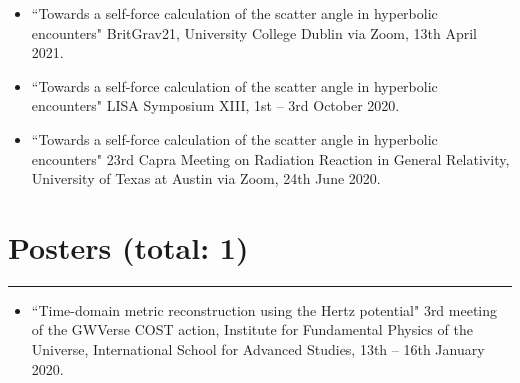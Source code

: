 \documentclass[10.5pt, oneside]{article}   	%
\begin{document}
\begin{itemize}
\item ``Towards a self-force calculation of the scatter angle in hyperbolic encounters" BritGrav21, University College Dublin via Zoom, 13th April 2021. \href{https://oliverlong.info/talks/britgrav21}{}
\item``Towards a self-force calculation of the scatter angle in hyperbolic encounters" LISA Symposium XIII, 1st -- 3rd October 2020. \href{https://lisasymposium13.lisamission.org/presentations/i0xMnRFWi7WKbO5f01caGDH0zPK2/7qz7uYC3qHuzj9AsC49h}{}
\item ``Towards a self-force calculation of the scatter angle in hyperbolic encounters" 23rd Capra Meeting on Radiation Reaction in General Relativity, University of Texas at Austin via Zoom, 24th June 2020. \href{https://www.youtube.com/watch?v=HB-Rw5kRUfg&t=11311s}{}
\end{itemize} 
 
{\color{Sectioncolour}
\section*{Posters {\rm (total: 1)}}
\vspace{-3mm}
\noindent\rule{\linewidth}{0.6pt}}
\begin{itemize}
\item ``Time-domain metric reconstruction using the Hertz potential" 3rd meeting of the GWVerse COST action, Institute for Fundamental Physics of the Universe, International School for Advanced Studies, 13th -- 16th January 2020.
\end{itemize} 

 
\end{document}
